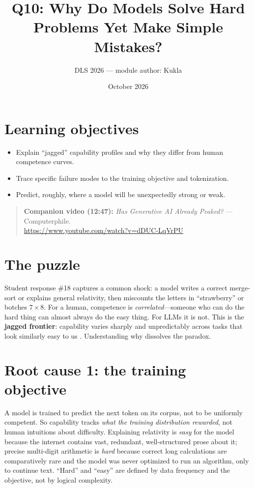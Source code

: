 \documentclass[11pt]{article}
\title{Q10: Why Do Models Solve Hard Problems Yet Make Simple Mistakes?}
\author{DLS 2026 --- module author: Kukla}
\date{October 2026}
\begin{document}
\maketitle

\section*{Learning objectives}
\begin{itemize}[leftmargin=1.4em]
\item Explain ``jagged'' capability profiles and why they differ from human competence curves.
\item Trace specific failure modes to the training objective and tokenization.
\item Predict, roughly, where a model will be unexpectedly strong or weak.
\end{itemize}

\begin{quote}\small\textbf{Companion video (12:47):} \emph{Has Generative AI Already Peaked?} --- Computerphile.\\ \url{https://www.youtube.com/watch?v=dDUC-LqVrPU}\end{quote}

\section{The puzzle}
Student response \#18 captures a common shock: a model writes a correct merge-sort or explains general
relativity, then miscounts the letters in ``strawberry'' or botches $7 \times 8$. For a human, competence
is \emph{correlated}---someone who can do the hard thing can almost always do the easy thing. For LLMs it
is not. This is the \textbf{jagged frontier}: capability varies sharply and unpredictably across tasks
that look similarly easy to us \citep{dellacqua2023jagged}. Understanding why dissolves the paradox.

\section{Root cause 1: the training objective}
A model is trained to predict the next token on its corpus, not to be uniformly competent. So capability
tracks \emph{what the training distribution rewarded}, not human intuitions about difficulty. Explaining
relativity is \emph{easy} for the model because the internet contains vast, redundant, well-structured
prose about it; precise multi-digit arithmetic is \emph{hard} because correct long calculations are
comparatively rare and the model was never optimized to run an algorithm, only to continue text. ``Hard''
and ``easy'' are defined by data frequency and the objective, not by logical complexity.
\end{document}
